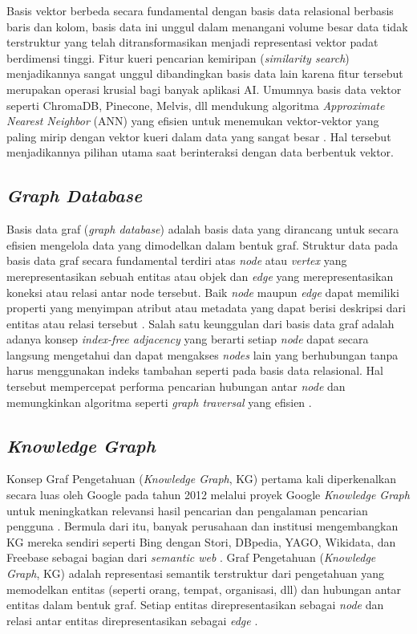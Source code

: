 Basis vektor berbeda secara fundamental dengan basis data relasional berbasis baris dan kolom, basis data ini unggul dalam menangani volume besar data tidak terstruktur yang telah ditransformasikan menjadi representasi vektor padat berdimensi tinggi.
Fitur kueri pencarian kemiripan (\textit{similarity search}) menjadikannya sangat unggul dibandingkan basis data lain karena fitur tersebut merupakan operasi krusial bagi banyak aplikasi AI.
Umumnya basis data vektor seperti ChromaDB, Pinecone, Melvis, dll mendukung algoritma \textit{Approximate Nearest Neighbor} (ANN) yang efisien untuk menemukan vektor-vektor yang paling mirip dengan vektor kueri dalam data yang sangat besar \cite{Han2023VectorDB_ANN_SimilaritySearch}.
Hal tersebut menjadikannya pilihan utama saat berinteraksi dengan data berbentuk vektor.

\subsection{\textit{Graph Database}}
Basis data graf (\textit{graph database}) adalah basis data yang dirancang untuk secara efisien mengelola data yang dimodelkan dalam bentuk graf.
Struktur data pada basis data graf secara fundamental terdiri atas \textit{node} atau \textit{vertex} yang merepresentasikan sebuah entitas atau objek dan \textit{edge} yang merepresentasikan koneksi atau relasi antar node tersebut.
Baik \textit{node} maupun \textit{edge} dapat memiliki properti yang menyimpan atribut atau metadata yang dapat berisi deskripsi dari entitas atau relasi tersebut \cite{Paul2019GraphDB}.
Salah satu keunggulan dari basis data graf adalah adanya konsep \textit{index-free adjacency} yang berarti setiap \textit{node} dapat secara langsung mengetahui dan dapat mengakses \textit{nodes} lain yang berhubungan tanpa harus menggunakan indeks tambahan seperti pada basis data relasional.
Hal tersebut mempercepat performa pencarian hubungan antar \textit{node} dan memungkinkan algoritma seperti \textit{graph traversal} yang efisien \cite{Paul2019GraphDB}.


\subsection{\textit{Knowledge Graph}}
Konsep Graf Pengetahuan (\textit{Knowledge Graph}, KG) pertama kali diperkenalkan secara luas oleh Google pada tahun 2012 melalui proyek Google \textit{Knowledge Graph} untuk meningkatkan relevansi hasil pencarian dan pengalaman pencarian pengguna \cite{Singhal2012IntroducingKnowledgeGraph}.
Bermula dari itu, banyak perusahaan dan institusi mengembangkan KG mereka sendiri seperti Bing dengan Stori, DBpedia, YAGO, Wikidata, dan Freebase sebagai bagian dari \textit{semantic web} \cite{Paulheim2016KnowledgeGraphSurvei}.
Graf Pengetahuan (\textit{Knowledge Graph}, KG) adalah representasi semantik terstruktur dari pengetahuan yang memodelkan entitas (seperti orang, tempat, organisasi, dll) dan hubungan antar entitas dalam bentuk graf.
Setiap entitas direpresentasikan sebagai \textit{node} dan relasi antar entitas direpresentasikan sebagai \textit{edge} \cite{Chen2020ReviewKnowldgeReasoningOverKnowledgeGraph}.


